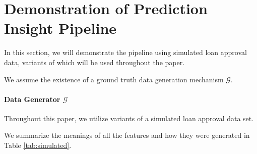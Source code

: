 \documentclass[mnsc,blindrev]{informs3}
\begin{document}
\section{Demonstration of Prediction Insight Pipeline}
\label{sec:pipeline_demo}
In this section, we will demonstrate the pipeline using simulated loan approval data, variants of which will be used throughout the paper.

We assume the existence of a ground truth data generation mechanism $\mathcal{G}$. 
 
 \paragraph{Data Generator $\mathcal{G}$}
 Throughout this paper, we utilize variants of a simulated loan approval data set. 
 
 
  We summarize the meanings of all the features and how they were generated in Table \ref{tab:simulated}. 
 
\end{document}
